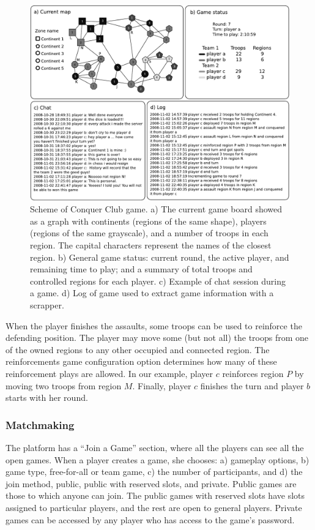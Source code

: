 \documentclass[a4paper,10pt]{book}
\theoremstyle{definition}
\begin{document}
\begin{figure}[ht!]
    \centering
    \includegraphics[width=0.8\linewidth]{figures/Fig5}
    \caption{Scheme of Conquer Club game. a) The current game board showed as a graph with continents (regions of the same shape), players (regions of the same grayscale), and a number of troops in each region. The capital characters represent the names of the closest region. b) General game status: current round, the active player, and remaining time to play; and a summary of total troops and controlled regions for each player. c) Example of chat session during a game. d) Log of game used to extract game information with a scrapper.}
    \label{conquerImage}
\end{figure}

When the player finishes the assaults, some troops can be used to reinforce the defending position.
The player may move some (but not all) the troops from one of the owned regions to any other occupied and connected region.
The reinforcements game configuration option determines how many of these reinforcement plays are allowed.
In our example, player $c$ reinforces region $P$ by moving two troops from region $M$.
Finally, player $c$ finishes the turn and player $b$ starts with her round.

\subsubsection*{Matchmaking}

The platform has a ``Join a Game'' section, where all the players can see all the open games.
When a player creates a game, she chooses: a) gameplay options, b) game type, free-for-all or team game, c) the number of participants, and d) the join method, public, public with reserved slots, and private.
Public games are those to which anyone can join.
The public games with reserved slots have slots assigned to particular players, and the rest are open to general players.
Private games can be accessed by any player who has access to the game's password.
\end{document}
